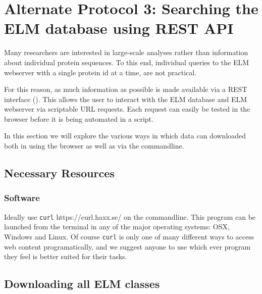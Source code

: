 \section{Alternate Protocol 3: Searching the ELM database using REST
API}\label{alternate-protocol-3-searching-the-elm-database-using-rest-api}

Many researchers are interested in large-scale analyses rather than
information about individual protein sequences. To this end, individual
queries to the ELM webserver with a single protein id at a time, are not
practical.

For this reason, as much information as possible is made available via a
REST interface (\cite{Fielding_2002}). This allows the user to interact
with the ELM database and ELM webserver via scriptable URL requests.
Each request can easily be tested in the browser before it is being
automated in a script.

In this section we will explore the various ways in which data can
downloaded both in using the browser as well as via the commandline.

\subsection{Necessary Resources}\label{necessary-resources-3}

\subsubsection{Software}\label{software-1}

Ideally use \texttt{curl} https://curl.haxx.se/ on the commandline. This
program can be launched from the terminal in any of the major operating
systems: OSX, Windows and Linux. Of course \texttt{curl} is only one of
many different ways to access web content programatically, and we
suggest anyone to use which ever program they feel is better suited for
their tasks.

\subsection{Downloading all ELM
classes}\label{downloading-all-elm-classes}

